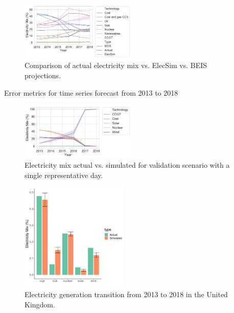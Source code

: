 \documentclass[final,3p,times,twocolumn,numbers]{elsarticle}
\begin{document}
\begin{figure}
\centering
\includegraphics[width=0.49\textwidth]{figures/results/throughout_years_beis_elecsim_comparison.pdf}
\caption{Comparison of actual electricity mix vs. ElecSim vs. BEIS projections.}
\label{fig:beis_elecsim_historic_comparison}
\end{figure}




\begin{table}[htb]
    \centering
{}
    \caption{Error metrics for time series forecast from 2013 to 2018}
    \label{table:metrics}
\end{table}


\begin{figure}
\centering
\includegraphics[width=0.49\textwidth]{figures/results/yearly_time_step_scenario.pdf}
\caption{Electricity mix actual vs. simulated for validation scenario with a single representative day.}
\label{uk_historical_mix}
\end{figure}










\begin{figure}
\centering
\includegraphics[width=0.46\textwidth]{figures/results/best_run.pdf}
\caption{Electricity generation transition from 2013 to 2018 in the United Kingdom.}
\label{fig:uk_validated_results}
\end{figure}
\end{document}
